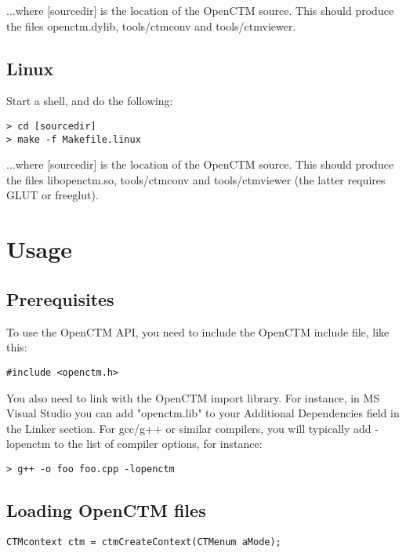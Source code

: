 ...where [sourcedir] is the location of the OpenCTM source. This should produce the
files openctm.dylib, tools/ctmconv and tools/ctmviewer.


\section{Linux}
Start a shell, and do the following:

\begin{lstlisting}
> cd [sourcedir]
> make -f Makefile.linux
\end{lstlisting}

...where [sourcedir] is the location of the OpenCTM source. This should produce the
files libopenctm.so, tools/ctmconv and tools/ctmviewer (the latter requires GLUT
or freeglut).




\chapter{Usage}

\section{Prerequisites}
To use the OpenCTM API, you need to include the OpenCTM include file, like this:

\begin{lstlisting}
#include <openctm.h>
\end{lstlisting}

You also need to link with the OpenCTM import library. For instance, in MS Visual Studio
you can add "openctm.lib" to your Additional Dependencies field in the Linker section.
For gcc/g++ or similar compilers, you will typically add -lopenctm to the list of
compiler options, for instance:

\begin{lstlisting}
> g++ -o foo foo.cpp -lopenctm
\end{lstlisting}



\section{Loading OpenCTM files}
\begin{lstlisting}
CTMcontext ctm = ctmCreateContext(CTMenum aMode);
\end{lstlisting}



